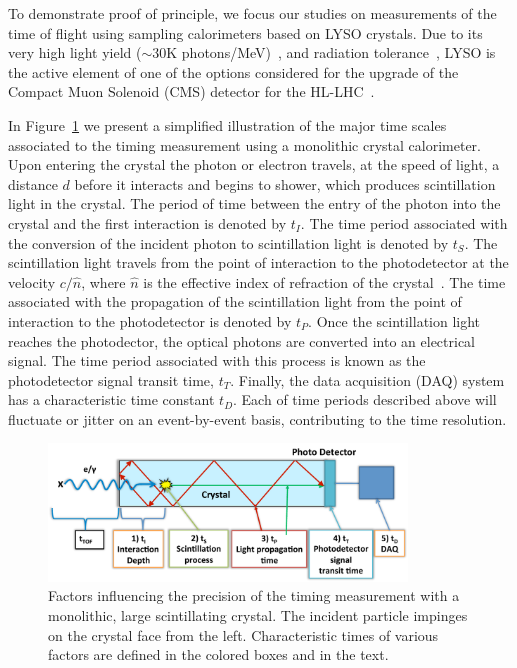 \documentclass[12pt]{article}
\begin{document}
To demonstrate proof of principle, we focus our studies on measurements of the
time of flight using sampling calorimeters based on LYSO crystals. Due to its
very high light yield ($\sim 30$K photons/MeV)~\cite{LYSOProperties}, and
radiation tolerance~\cite{5402126, 4291695, 5402125, Dissertori:2013rma}, LYSO
is the active element of one of the options considered for the upgrade of the
Compact Muon Solenoid (CMS) detector for the HL-LHC~\cite{Contardo:1605208}. 

In Figure~\ref{fig:ScintillatorTiming} we present a simplified illustration of
the major time scales associated to the timing measurement using a monolithic
crystal calorimeter. Upon entering the crystal the photon or electron travels,
at the speed of light, a distance $d$ before it interacts and begins to shower,
which produces scintillation light in the crystal. The period of time between
the entry of the photon into the crystal and the first interaction is denoted by
$t_I$. The time period associated with the conversion of the incident photon to
scintillation light is denoted by $t_S$. The scintillation light travels from
the point of interaction to the photodetector at the velocity $c/\hat{n}$, where
$\hat{n}$ is the effective index of refraction of the crystal~\cite{Moses}. The
time associated with the propagation of the scintillation light from the point
of interaction to the photodetector is denoted by $t_P$. Once the scintillation
light reaches the photodector, the optical photons are converted into an
electrical signal. The time period associated with this process is known as the
photodetector signal transit time, $t_T$. Finally, the data acquisition (DAQ)
system has a characteristic time constant $t_D$. Each of time periods described
above will fluctuate or jitter on an event-by-event basis, contributing to the
time resolution.


\begin{figure}[h] \centering
\includegraphics[width=0.85\textwidth]{figs/ScintillatorTiming_v2}
\caption{Factors influencing the precision of the timing measurement with a
monolithic, large scintillating crystal. The incident particle impinges on the
crystal face from the left. Characteristic times of various factors are defined
in the colored boxes and in the text.}
\label{fig:ScintillatorTiming}
\end{figure}
\end{document}
